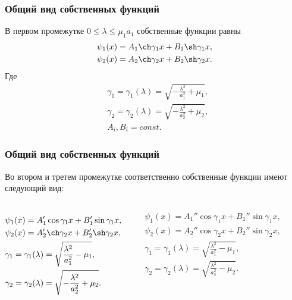 \documentclass[10pt,pdf,hyperref={unicode}]{beamer}
\newcommand{\const}{\ensuremath{const}}
\begin{document}
\begin{frame}
  \frametitle{Общий вид собственных функций}
    В первом промежутке $ 0 \le \lambda \le \mu_1a_1$ собственные функции равны
    \begin{equation*}
      \begin{aligned}
        \psi_1(x) = A_1 \ch \gamma_1x + B_1 \sh \gamma_1x, \\
        \psi_2(x) = A_2 \ch \gamma_2x + B_2 \sh \gamma_2x.
      \end{aligned}
    \end{equation*}
    Где
    \begin{equation*}
      \begin{aligned}
        & \gamma_1 = \gamma_1(\lambda) = \sqrt{- \frac{\lambda^2}{a_1^2} + \mu_1}, \\
        & \gamma_2 = \gamma_2(\lambda) = \sqrt{- \frac{\lambda^2}{a_2^2} + \mu_2}, \\
        & A_i, B_i = \const.
      \end{aligned}
    \end{equation*}
\end{frame}

\begin{frame}
  \frametitle{Общий вид собственных функций}
  Во втором и третем промежутке соответственно собственные функции имеют следующий вид:
  \begin{columns}
      \begin{equation*}
        \begin{aligned}
          & \psi_1(x) = A_1' \cos \gamma_1x + B_1' \sin \gamma_1x, \\
          & \psi_2(x) = A_2' \ch \gamma_2x + B_2' \sh \gamma_2x, \\
          & \gamma_1 = \gamma_1(\lambda) = \sqrt{\frac{\lambda^2}{a_1^2} - \mu_1}, \\
          & \gamma_2 = \gamma_2(\lambda) = \sqrt{- \frac{\lambda^2}{a_2^2} + \mu_2}.
        \end{aligned}
      \end{equation*}


      \begin{equation*}
        \begin{aligned}
          & \psi_1(x) = A_1'' \cos \gamma_1x + B_1'' \sin \gamma_1x, \\
          & \psi_2(x) = A_2'' \cos \gamma_2x + B_2'' \sin \gamma_2x, \\
          & \gamma_1 = \gamma_1(\lambda) = \sqrt{\frac{\lambda^2}{a_1^2} - \mu_1}, \\
          & \gamma_2 = \gamma_2(\lambda) = \sqrt{\frac{\lambda^2}{a_2^2} - \mu_2}.
        \end{aligned}
      \end{equation*}
  \end{columns}
\end{frame}
\end{document}
